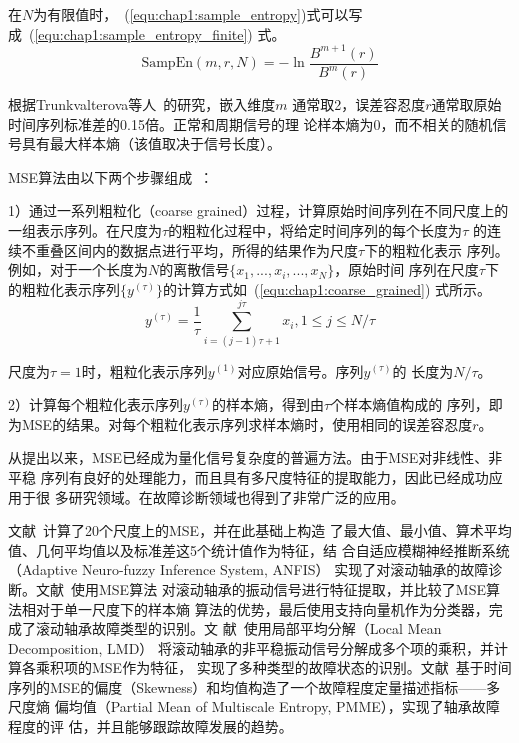 在$N$为有限值时，~(\ref{equ:chap1:sample_entropy})式可以写成~(\ref{equ:chap1:sample_entropy_finite})
式。
\begin{equation}
  \label{equ:chap1:sample_entropy_finite}
  \text{SampEn}(m, r, N) = -\ln\frac{B^{m+1}(r)}{B^m(r)}
\end{equation}

根据Trunkvalterova等人~\cite{trunkvalterova2008reduced}的研究，嵌入维度$m$
通常取2，误差容忍度$r$通常取原始时间序列标准差的0.15倍。正常和周期信号的理
论样本熵为0，而不相关的随机信号具有最大样本熵（该值取决于信号长度）。

MSE算法由以下两个步骤组成~\cite{costa2002multiscale, costa2005multiscale}：

1）通过一系列粗粒化（coarse grained）过程，计算原始时间序列在不同尺度上的
一组表示序列。在尺度为$\tau$的粗粒化过程中，将给定时间序列的每个长度为$\tau$
的连续不重叠区间内的数据点进行平均，所得的结果作为尺度$\tau$下的粗粒化表示
序列。例如，对于一个长度为$N$的离散信号$\{x_1,...,x_i,...,x_N\}$，原始时间
序列在尺度$\tau$下的粗粒化表示序列$\{y^{(\tau)}\}$的计算方式如~(\ref{equ:chap1:coarse_grained})
式所示。
\begin{equation}
  \label{equ:chap1:coarse_grained}
  y^{(\tau)} = \frac{1}{\tau}\sum_{i=(j-1)\tau + 1}^{j\tau}x_i , 1\leq j\leq N/\tau
\end{equation}

尺度为$\tau=1$时，粗粒化表示序列$y^{(1)}$对应原始信号。序列$y^{(\tau)}$的
长度为$N/\tau$。

2）计算每个粗粒化表示序列$y^{(\tau)}$的样本熵，得到由$\tau$个样本熵值构成的
序列，即为MSE的结果。对每个粗粒化表示序列求样本熵时，使用相同的误差容忍度$r$。

从提出以来，MSE已经成为量化信号复杂度的普遍方法。由于MSE对非线性、非平稳
序列有良好的处理能力，而且具有多尺度特征的提取能力，因此已经成功应用于很
多研究领域。在故障诊断领域也得到了非常广泛的应用。

文献~计算了20个尺度上的MSE，并在此基础上构造
了最大值、最小值、算术平均值、几何平均值以及标准差这5个统计值作为特征，结
合自适应模糊神经推断系统（Adaptive Neuro-fuzzy Inference System, ANFIS）
实现了对滚动轴承的故障诊断。文献~使用MSE算法
对滚动轴承的振动信号进行特征提取，并比较了MSE算法相对于单一尺度下的样本熵
算法的优势，最后使用支持向量机作为分类器，完成了滚动轴承故障类型的识别。文
献~使用局部平均分解（Local Mean Decomposition, LMD）
将滚动轴承的非平稳振动信号分解成多个项的乘积，并计算各乘积项的MSE作为特征，
实现了多种类型的故障状态的识别。文献~基于时间
序列的MSE的偏度（Skewness）和均值构造了一个故障程度定量描述指标——多尺度熵
偏均值（Partial Mean of Multiscale Entropy, PMME），实现了轴承故障程度的评
估，并且能够跟踪故障发展的趋势。

